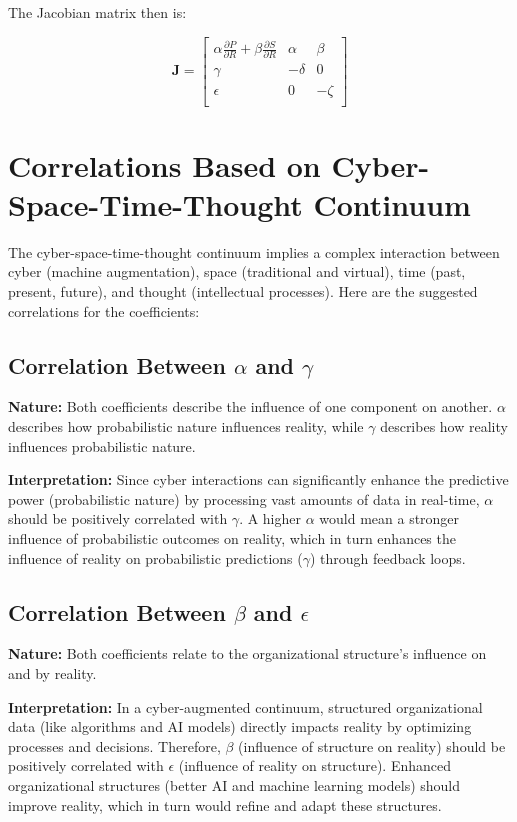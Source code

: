 \documentclass{article}
\begin{document}
The Jacobian matrix then is:

\[
\mathbf{J} = \begin{bmatrix}
\alpha \frac{\partial P}{\partial R} + \beta \frac{\partial S}{\partial R} & \alpha & \beta \\
\gamma & -\delta & 0 \\
\epsilon & 0 & -\zeta \\
\end{bmatrix}
\]

\section{Correlations Based on Cyber-Space-Time-Thought Continuum}

The cyber-space-time-thought continuum implies a complex interaction between cyber (machine augmentation), space (traditional and virtual), time (past, present, future), and thought (intellectual processes). Here are the suggested correlations for the coefficients:

\subsection{Correlation Between \(\alpha\) and \(\gamma\)}
\textbf{Nature:} Both coefficients describe the influence of one component on another. \(\alpha\) describes how probabilistic nature influences reality, while \(\gamma\) describes how reality influences probabilistic nature.

\textbf{Interpretation:} Since cyber interactions can significantly enhance the predictive power (probabilistic nature) by processing vast amounts of data in real-time, \(\alpha\) should be positively correlated with \(\gamma\). A higher \(\alpha\) would mean a stronger influence of probabilistic outcomes on reality, which in turn enhances the influence of reality on probabilistic predictions (\(\gamma\)) through feedback loops.

\subsection{Correlation Between \(\beta\) and \(\epsilon\)}
\textbf{Nature:} Both coefficients relate to the organizational structure's influence on and by reality.

\textbf{Interpretation:} In a cyber-augmented continuum, structured organizational data (like algorithms and AI models) directly impacts reality by optimizing processes and decisions. Therefore, \(\beta\) (influence of structure on reality) should be positively correlated with \(\epsilon\) (influence of reality on structure). Enhanced organizational structures (better AI and machine learning models) should improve reality, which in turn would refine and adapt these structures.
\end{document}
